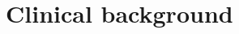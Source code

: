 \documentclass[a4paper,12pt,twoside]{report}
\author{\me}
\begin{document}


\normalsize

\clearemptydoublepage

\linenumbers

%



\tableofcontents

\clearemptydoublepage




\clearemptydoublepage
\printnomenclature
\clearemptydoublepage
\setcounter{page}{0}






\clearemptydoublepage



%
\clearemptydoublepage


\chapter{ Clinical background}\label{chapter:clinicalbachground}


\clearemptydoublepage
\end{document}
